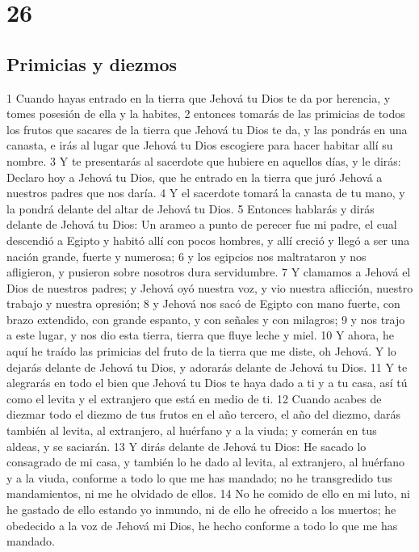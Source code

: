 \chapter{26}

\section{Primicias y diezmos}

1 Cuando hayas entrado en la tierra que Jehová tu Dios te da por herencia, y tomes posesión de ella y la habites,
2 entonces tomarás de las primicias de todos los frutos que sacares de la tierra que Jehová tu Dios te da, y las pondrás en una canasta, e irás al lugar que Jehová tu Dios escogiere para hacer habitar allí su nombre.
3 Y te presentarás al sacerdote que hubiere en aquellos días, y le dirás: Declaro hoy a Jehová tu Dios, que he entrado en la tierra que juró Jehová a nuestros padres que nos daría.
4 Y el sacerdote tomará la canasta de tu mano, y la pondrá delante del altar de Jehová tu Dios.
5 Entonces hablarás y dirás delante de Jehová tu Dios: Un arameo a punto de perecer fue mi padre, el cual descendió a Egipto y habitó allí con pocos hombres, y allí creció y llegó a ser una nación grande, fuerte y numerosa;
6 y los egipcios nos maltrataron y nos afligieron, y pusieron sobre nosotros dura servidumbre.
7 Y clamamos a Jehová el Dios de nuestros padres; y Jehová oyó nuestra voz, y vio nuestra aflicción, nuestro trabajo y nuestra opresión;
8 y Jehová nos sacó de Egipto con mano fuerte, con brazo extendido, con grande espanto, y con señales y con milagros;
9 y nos trajo a este lugar, y nos dio esta tierra, tierra que fluye leche y miel.
10 Y ahora, he aquí he traído las primicias del fruto de la tierra que me diste, oh Jehová. Y lo dejarás delante de Jehová tu Dios, y adorarás delante de Jehová tu Dios.
11 Y te alegrarás en todo el bien que Jehová tu Dios te haya dado a ti y a tu casa, así tú como el levita y el extranjero que está en medio de ti.
12 Cuando acabes de diezmar todo el diezmo de tus frutos en el año tercero, el año del diezmo, darás también al levita, al extranjero, al huérfano y a la viuda; y comerán en tus aldeas, y se saciarán. 
13 Y dirás delante de Jehová tu Dios: He sacado lo consagrado de mi casa, y también lo he dado al levita, al extranjero, al huérfano y a la viuda, conforme a todo lo que me has mandado; no he transgredido tus mandamientos, ni me he olvidado de ellos.
14 No he comido de ello en mi luto, ni he gastado de ello estando yo inmundo, ni de ello he ofrecido a los muertos; he obedecido a la voz de Jehová mi Dios, he hecho conforme a todo lo que me has mandado.
